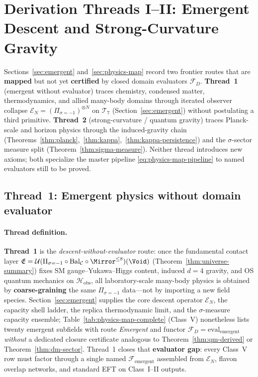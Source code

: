\section{Derivation Threads I--II: Emergent Descent and Strong-Curvature Gravity}
\label{sec:threads-1-2}

Sections~\ref{sec:emergent} and~\ref{sec:physics-map} record two frontier
routes that are \textbf{mapped} but not yet \textbf{certified} by closed
domain evaluators $\mathcal{F}_D$. \textbf{Thread~1} (emergent without
evaluator) traces chemistry, condensed matter, thermodynamics, and allied
many-body domains through iterated observer collapse
$\mathcal{E}_N=(\Pi_{\sigma=-1})^{\otimes N}$ on $\mathcal{T}_7$
(Section~\ref{sec:emergent}) without postulating a third primitive.
\textbf{Thread~2} (strong-curvature / quantum gravity) traces Planck-scale and
horizon physics through the induced-gravity chain
(Theorems~\ref{thm:planck},~\ref{thm:kappa},~\ref{thm:kappa-persistence})
and the $\sigma$-sector measure split (Theorem~\ref{thm:sigma-measure}).
Neither thread introduces new axioms; both specialize the master pipeline
\eqref{eq:physics-map-pipeline} to named evaluators still to be proved.

\subsection{Thread~1: Emergent physics without domain evaluator}
\label{sec:thread-1}

\paragraph{Thread definition.}
\textbf{Thread~1} is the \emph{descent-without-evaluator} route: once the
fundamental contact layer
$\mathfrak{E}=\mathcal{U}(\Pi_{\sigma=-1}\circ\mathrm{Bal}_{\mathcal{C}}
\circ\Mirror^{\leq 8})(\Void)$
(Theorem~\ref{thm:universe-summary}) fixes SM gauge--Yukawa--Higgs content,
induced $d=4$ gravity, and OS quantum mechanics on $\mathcal{H}_{\mathrm{obs}}$,
all laboratory-scale many-body physics is obtained by \textbf{coarse-graining}
the same $\Pi_{\sigma=-1}$ data---not by importing a new field species.
Section~\ref{sec:emergent} supplies the core descent operator
$\mathcal{E}_N$, the capacity shell ladder, the replica thermodynamic limit,
and the $\sigma$-measure capacity ensemble; Table~\ref{tab:physics-map-complete}
(Class~V) nonetheless lists twenty emergent subfields with route
\emph{Emergent} and functor
$\mathcal{F}_D=\mathrm{eval}_{\mathrm{emergent}}$ \emph{without} a dedicated
closure certificate analogous to Theorem~\ref{thm:qm-derived} or
Theorem~\ref{thm:dm-sector}. Thread~1 closes that \textbf{evaluator gap}:
every Class~V row must factor through a single named
$\mathcal{F}_{\mathrm{emergent}}$ assembled from $\mathcal{E}_N$, flavon
overlap networks, and standard EFT on Class~I--II outputs.

